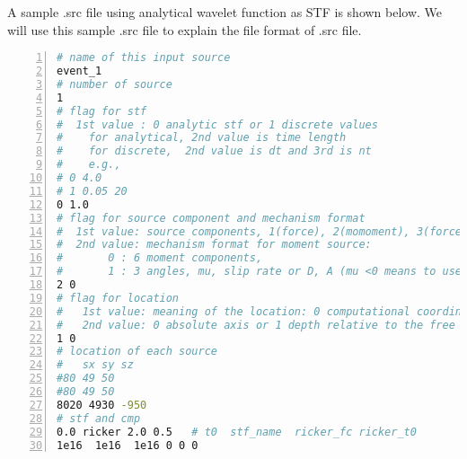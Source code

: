 A sample .src file using analytical wavelet function as STF is shown below.
 We will use this sample .src file to explain the file format of .src file.
\begin{lstlisting}[language=bash, caption=Source input file using analytical wavelet,
   numbers=left, numbersep=5pt,numberstyle=\tiny\color{codegray}, commentstyle=\color{codegreen},
   frame=tb]
# name of this input source
event_1
# number of source
1
# flag for stf
#  1st value : 0 analytic stf or 1 discrete values
#    for analytical, 2nd value is time length
#    for discrete,  2nd value is dt and 3rd is nt
#    e.g.,
# 0 4.0 
# 1 0.05 20
0 1.0
# flag for source component and mechanism format
#  1st value: source components, 1(force), 2(momoment), 3(force+moment)
#  2nd value: mechanism format for moment source:
#       0 : 6 moment components, 
#       1 : 3 angles, mu, slip rate or D, A (mu <0 means to use internal mu value)
2 0
# flag for location
#   1st value: meaning of the location: 0 computational coordinate, 1 physical coordinate
#   2nd value: 0 absolute axis or 1 depth relative to the free surface of the third coordinate
1 0
# location of each source
#   sx sy sz
#80 49 50
#80 49 50
8020 4930 -950
# stf and cmp
0.0 ricker 2.0 0.5   # t0  stf_name  ricker_fc ricker_t0
1e16  1e16  1e16 0 0 0 
\end{lstlisting}


